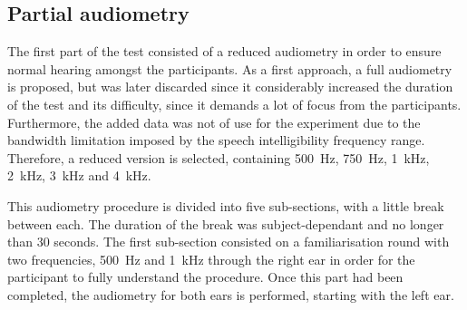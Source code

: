 \subsection{Partial audiometry}
The first part of the test consisted of a reduced audiometry in order to ensure normal hearing amongst the participants. As a first approach, a full audiometry is proposed, but was later discarded since it considerably increased the duration of the test and its difficulty, since it demands a lot of focus from the participants. Furthermore, the added data was not of use for the experiment due to the bandwidth limitation imposed by the speech intelligibility frequency range. Therefore, a reduced version is selected, containing \SI{500}{\hertz}, \SI{750}{\hertz}, \SI{1}{\kilo\hertz}, \SI{2}{\kilo\hertz}, \SI{3}{\kilo\hertz} and \SI{4}{\kilo\hertz}.

This audiometry procedure is divided into five sub-sections, with a little break between each. The duration of the break was subject-dependant and no longer than 30 seconds.
The first sub-section consisted on a familiarisation round with two frequencies, \SI{500}{\hertz} and \SI{1}{\kilo\hertz} through the right ear in order for the participant to fully understand the procedure. Once this part had been completed, the audiometry for both ears is performed, starting with the left ear.  
   
